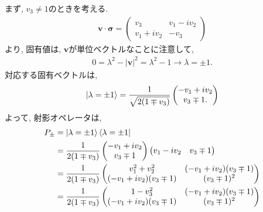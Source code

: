 \begin{ex}
    \label{ex2.60}
    まず, $v_3 \neq 1$のときを考える.
    \begin{align*}
        \bm{v} \cdot \bm{\sigma}
        =
        \begin{pmatrix}
            v_3         & v_1 - i v_2 \\
            v_1 + i v_2 & - v_3
        \end{pmatrix}
    \end{align*}
    より, 固有値は, $\bm{v}$が単位ベクトルなことに注意して,
    \begin{align*}
        0 = \lambda^2 - |\bm{v}|^2 = \lambda^2 - 1
        \to \lambda = \pm1.
    \end{align*}
    対応する固有ベクトルは,
    \begin{align*}
        \ket{\lambda=\pm1} =
        \frac{1}{\sqrt{2(1\mp v_3)}}
        \begin{pmatrix}
            -v_1 + i v_2 \\ v_3 \mp 1.
        \end{pmatrix}
    \end{align*}
    よって, 射影オペレータは,
    \begin{align*}
        P_{\pm}
         & = \ket{\lambda = \pm1} \bra{\lambda = \pm1} \\
         & =
        \frac{1}{2(1\mp v_3)}
        \begin{pmatrix}
            -v_1 + i v_2 \\ v_3 \mp 1
        \end{pmatrix}
        \begin{pmatrix}
            v_1 - i v_2 & v_3 \mp 1
        \end{pmatrix}                    \\
         & =
        \frac{1}{2(1\mp v_3)}
        \begin{pmatrix}
            v_1^2 + v_2^2            & (-v_1 + i v_2)(v_3 \mp1) \\
            (-v_1 + i v_2)(v_3 \mp1) & (v_3 \mp 1)^2
        \end{pmatrix}                    \\
         & =
        \frac{1}{2(1\mp v_3)}
        \begin{pmatrix}
            1 - v_3^2                & (-v_1 + i v_2)(v_3 \mp1) \\
            (-v_1 + i v_2)(v_3 \mp1) & (v_3 \mp 1)^2
        \end{pmatrix}                    \\

\end{align*}
\end{ex}
